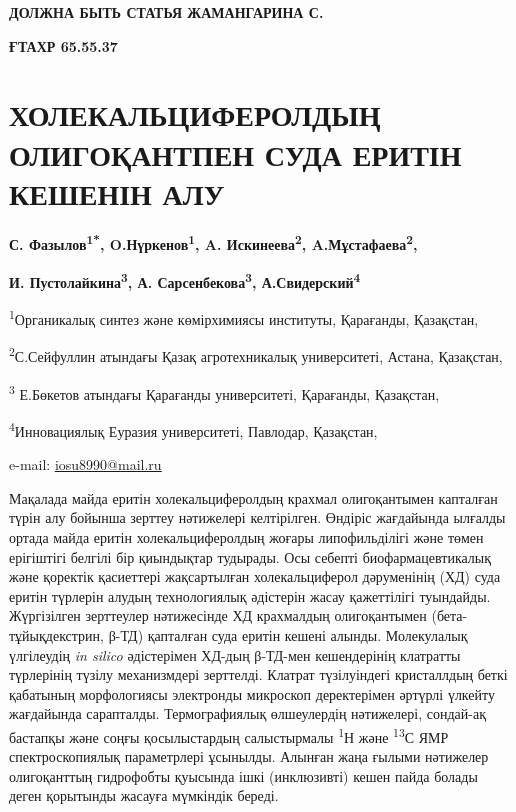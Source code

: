 {\bfseries ДОЛЖНА БЫТЬ СТАТЬЯ ЖАМАНГАРИНА С.}

{\bfseries ҒТАХР 65.55.37}

\section{ХОЛЕКАЛЬЦИФЕРОЛДЫҢ ОЛИГОҚАНТПЕН СУДА ЕРИТІН КЕШЕНІН АЛУ}

\begin{center}
{\bfseries С. Фазылов\textsuperscript{1*}, O.Нүркенов\textsuperscript{1},
A. Искинеева\textsuperscript{2}, A.Мұстафаева\textsuperscript{2},}

{\bfseries И. Пустолайкина\textsuperscript{3}, А.
Сарсенбекова\textsuperscript{3}, А.Свидерский\textsuperscript{4}}

\textsuperscript{1}Органикалық синтез және көмірхимиясы институты,
Қарағанды, Қазақстан,

\textsuperscript{2}С.Сейфуллин атындағы Қазақ агротехникалық
университеті, Астана, Қазақстан,

\textsuperscript{3} Е.Бөкетов атындағы Қарағанды университеті,
Қарағанды, Қазақстан,

\textsuperscript{4}Инновациялық Еуразия университеті, Павлодар,
Қазақстан,

e-mail: \href{mailto:iosu8990@mail.ru}{\ul{iosu8990@mail.ru}}
\end{center}

Мақалада майда еритін холекальциферолдың крахмал олигоқантымен капталған
түрін алу бойынша зерттеу нәтижелері келтірілген. Өндіріс жағдайында
ылғалды ортада майда еритін холекальциферолдың жоғары липофильділігі
және төмен ерігіштігі белгілі бір қиындықтар тудырады. Осы себепті
биофармацевтикалық және қоректік қасиеттері жақсартылған холекальциферол
дәруменінің (ХД) суда еритін түрлерін алудың технологиялық әдістерін
жасау қажеттілігі туындайды. Жүргізілген зерттеулер нәтижесінде ХД
крахмалдың олигоқантымен (бета-тұйықдекстрин, β-ТД) қапталған суда
еритін кешені алынды. Молекулалық үлгілеудің \emph{in silico}
әдістерімен ХД-дың β-ТД-мен кешендерінің клатратты түрлерінің түзілу
механизмдері зерттелді. Клатрат түзілуіндегі кристаллдың беткі қабатының
морфологиясы электронды микроскоп деректерімен әртүрлі үлкейту
жағдайында сарапталды. Термографиялық өлшеулердің нәтижелері, сондай-ақ
бастапқы және соңғы қосылыстардың салыстырмалы \textsuperscript{1}Н және
\textsuperscript{13}С ЯМР спектроскопиялық параметрлері ұсынылды.
Алынған жаңа ғылыми нәтижелер олигоқанттың гидрофобты қуысында ішкі
(инклюзивті) кешен пайда болады деген қорытынды жасауға мүмкіндік
береді.

